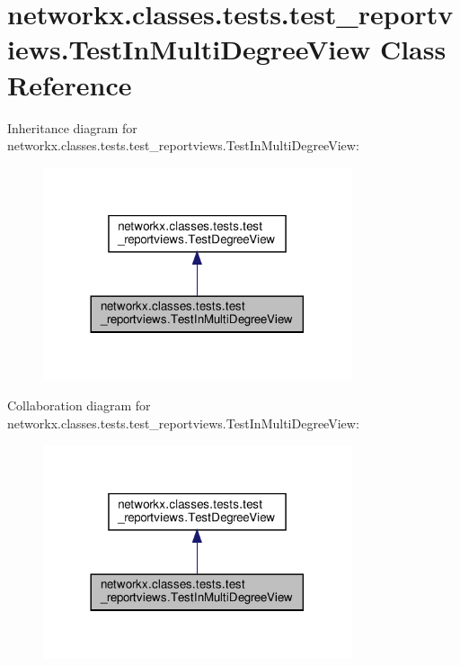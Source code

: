 \hypertarget{classnetworkx_1_1classes_1_1tests_1_1test__reportviews_1_1TestInMultiDegreeView}{}\section{networkx.\+classes.\+tests.\+test\+\_\+reportviews.\+Test\+In\+Multi\+Degree\+View Class Reference}
\label{classnetworkx_1_1classes_1_1tests_1_1test__reportviews_1_1TestInMultiDegreeView}


Inheritance diagram for networkx.\+classes.\+tests.\+test\+\_\+reportviews.\+Test\+In\+Multi\+Degree\+View\+:
\nopagebreak
\begin{figure}[H]
\begin{center}
\leavevmode
\includegraphics[width=257pt]{classnetworkx_1_1classes_1_1tests_1_1test__reportviews_1_1TestInMultiDegreeView__inherit__graph}
\end{center}
\end{figure}


Collaboration diagram for networkx.\+classes.\+tests.\+test\+\_\+reportviews.\+Test\+In\+Multi\+Degree\+View\+:
\nopagebreak
\begin{figure}[H]
\begin{center}
\leavevmode
\includegraphics[width=257pt]{classnetworkx_1_1classes_1_1tests_1_1test__reportviews_1_1TestInMultiDegreeView__coll__graph}
\end{center}
\end{figure}
